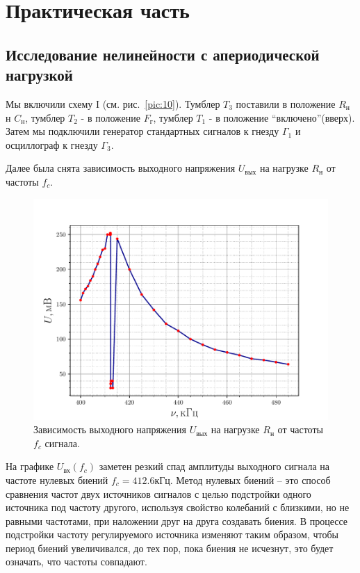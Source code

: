 \section{Практическая часть}
\subsection{Исследование нелинейности с апериодической нагрузкой}
Мы включили схему I (см. рис.~\ref{pic:10}). Тумблер $T_3$ поставили в положение $R_{\text{н}}$ н $C_{\text{н}}$,
тумблер $T_2$ - в положение $F_{\text{г}}$, тумблер $T_1$ - в положение “включено”(вверх). Затем мы
подключили генератор стандартных сигналов к гнезду $\Gamma_1$ и осциллограф к гнезду $\Gamma_3$.

Далее была снята зависимость выходного напряжения $U_{\text{вых}}$ на нагрузке $R_{\text{н}}$ от частоты $f_c$. 
\begin{figure}[H]
	\centering
	\includegraphics[width=\textwidth]{fig/exp1.pdf}
	\caption{Зависимость выходного напряжения $U_{\text{вых}}$ на нагрузке $R_{\text{н}}$ от частоты $f_c$ сигнала.}
	\label{exp:1}
\end{figure}

На графике $U_\text{вх}(f_c)$ заметен резкий спад амплитуды выходного сигнала на частоте нулевых биений $f_c=412.6\text{кГц}$. Метод нулевых биений -- это способ сравнения частот двух источников сигналов с целью подстройки одного источника под частоту другого, используя свойство колебаний с близкими, но не равными частотами, при наложении друг на друга создавать биения. В процессе подстройки частоту регулируемого источника изменяют таким образом, чтобы период биений увеличивался, до тех пор, пока биения не исчезнут, это будет означать, что частоты совпадают. 

